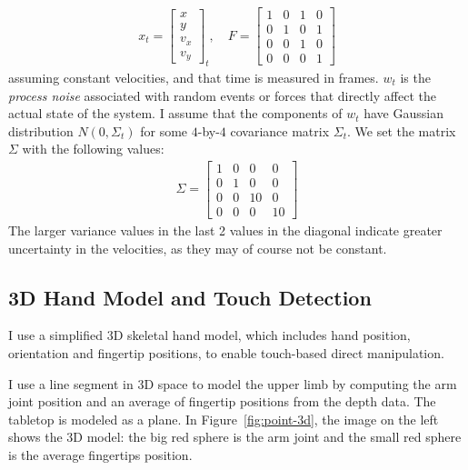 \begin{align*}
x_t = \begin{bmatrix}
  x   \\
  y   \\
  v_x \\
  v_y \end{bmatrix}_t, \quad
F = \begin{bmatrix}
  1 & 0 & 1 & 0 \\
  0 & 1 & 0 & 1 \\
  0 & 0 & 1 & 0 \\
  0 & 0 & 0 & 1 \end{bmatrix}
\end{align*}
assuming constant velocities, and that time is measured in frames.
$w_t$ is the \textit{process noise} associated with random events or forces
that directly affect the actual state of the system. I assume that the 
components of $w_t$ have Gaussian distribution $N(0, \Sigma_t)$ for some
$4$-by-$4$ covariance matrix $\Sigma_t$. We set the matrix $\Sigma$ with the
following values:
\begin{align*}
\Sigma = \begin{bmatrix}
  1 & 0 & 0 & 0 \\
  0 & 1 & 0 & 0 \\
  0 & 0 & 10 & 0 \\
  0 & 0 & 0 & 10 
  \end{bmatrix}
\end{align*}
The larger variance values in the last 2 values in the diagonal indicate
greater uncertainty in the velocities, as they may of course not be constant.

\subsection{3D Hand Model and Touch Detection}
I use a simplified 3D
skeletal hand model, which includes hand position, orientation and
fingertip positions, to enable touch-based direct manipulation. 

I use a line segment in 3D space to model the upper limb by computing the arm
joint position and an average of fingertip positions from the depth data. The
tabletop is modeled as a plane. In Figure~\ref{fig:point-3d}, the image on the
left shows the 3D model: the big red sphere is the arm joint and the small red
sphere is the average fingertips position. 

